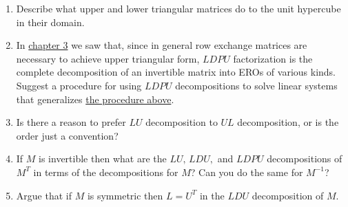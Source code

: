 \begin{enumerate}
\item Describe what upper and lower triangular matrices do to the unit hypercube in their domain.

\item In \hyperlink{LDPU}{chapter 3} we saw that, since in general row exchange matrices are necessary to achieve upper triangular form, $LDPU$ factorization is the complete decomposition of an invertible matrix into EROs of various kinds. 
Suggest a procedure for using $LDPU$ decompositions to solve linear systems that generalizes \hyperlink{LUproc}{the procedure above}. 

\item Is there a reason to prefer $LU$ decomposition to $UL$ decomposition, or is the order just a convention? 

\item If $M$ is invertible then what are the  $LU,\,LDU,$ and $LDPU$ decompositions of $M^{T}$ in terms of the decompositions for $M$? Can you do the same for $M^{-1}$? 

 
\item Argue that if $M$ is symmetric then $L=U^T$ in the $LDU$ decomposition of $M$. 







\end{enumerate}

